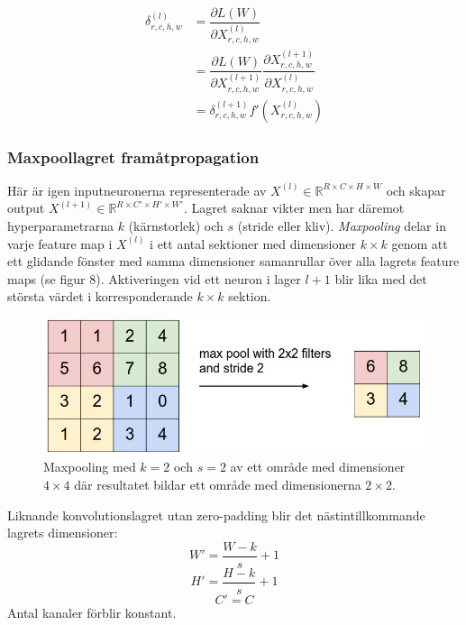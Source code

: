 \documentclass[a4paper,11pt,twoside]{article}
\newcommand*{\pd}[2]{\ensuremath{\dfrac{\partial #1}{\partial #2}}}
\begin{document}
\begin{equation}
\begin{split}
\delta^{(l)}_{r,c,h,w}
		& = \pd{L(W)}{X^{(l)}_{r,c,h,w}} \\
		& = \pd{L(W)}{X^{(l+1)}_{r,c,h,w}} \pd{X^{(l+1)}_{r,c,h,w}}{X^{(l)}_{r,c,h,w}} \\
		& = \delta^{(l+1)}_{r,c,h,w} f'(X^{(l)}_{r,c,h,w})
\end{split}
\end{equation}

\subsubsection{Maxpoollagret framåtpropagation}
Här är igen inputneuronerna representerade av $X^{(l)} \in \mathbb{R}^{R \times C \times H \times W}$ och skapar output $X^{(l+1)} \in \mathbb{R}^{R \times C' \times H' \times W'}$. Lagret saknar vikter men har däremot hyperparametrarna $k$ (kärnstorlek) och $s$ (stride eller kliv). \textit{Maxpooling} delar in varje feature map i $X^{(l)}$ i ett antal sektioner med dimensioner $k \times k$ genom att ett glidande fönster med samma dimensioner samanrullar över alla lagrets feature maps (se figur 8). Aktiveringen vid ett neuron i lager $l+1$ blir lika med det största värdet i korresponderande $k \times k$ sektion. \cite{cs231n} \cite{convmath} \cite{convarithmetic}

\begin{figure}[h]\label{figmaxpool}
	\centering
  		\includegraphics[scale=0.7]{maxpool.png}
  	\caption{Maxpooling med $k=2$ och $s=2$ av ett område med dimensioner $4 \times 4$ där resultatet bildar ett område med dimensionerna $2 \times 2$.}
\end{figure}

Liknande konvolutionslagret utan zero-padding blir det nästintillkommande lagrets dimensioner: \cite{cs231n} \cite{convmath} \cite{convarithmetic}
\begin{equation}
W' = \frac{W-k}{s}+1
\end{equation}
\begin{equation}
H' = \frac{H-k}{s}+1
\end{equation}
\begin{equation}
C' = C
\end{equation}
Antal kanaler förblir konstant. \cite{cs231n} \cite{convmath}
\end{document}
